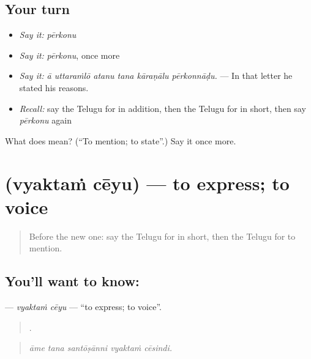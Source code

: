 \subsection*{Your turn}
\begin{itemize}
\raggedright
  \item \emph{Say it:} \emph{pērkonu}
  \item \emph{Say it:} \emph{pērkonu}, once more
  \item \emph{Say it:} \emph{ā uttaraṁlō atanu tana kāraṇālu pērkonnāḍu.} — In that letter he stated his reasons.
  \item \emph{Recall:} say the Telugu for in addition, then the Telugu for in short, then say \emph{pērkonu} again
\end{itemize}

\begin{tcolorbox}[breakable,colback=teal!4,colframe=teal!35!black,title={Before you move on}]
What does  mean? (\textquotedblleft{}To mention; to state\textquotedblright{}.) Say it once more.
\end{tcolorbox}
\section[\texorpdfstring{\te{వ్యక్తం} \te{చేయు} (vyaktaṁ cēyu)}{వ్యక్తం చేయు (vyaktaṁ cēyu)}]{  (vyaktaṁ cēyu) — to express; to voice}

\label{lesson:TE-C397-vyaktam-ceyu}



\begin{quote}
Before the new one: say the Telugu for in short, then the Telugu for to mention.
\end{quote}

\subsection*{You'll want to know:  }
\textbf{ } — \emph{vyaktaṁ cēyu} — \textquotedblleft{}to express; to voice\textquotedblright{}.

\begin{quote}
    .
\end{quote}

\begin{quote}
\emph{āme tana santōṣānni vyaktaṁ cēsindi.}
\end{quote}

